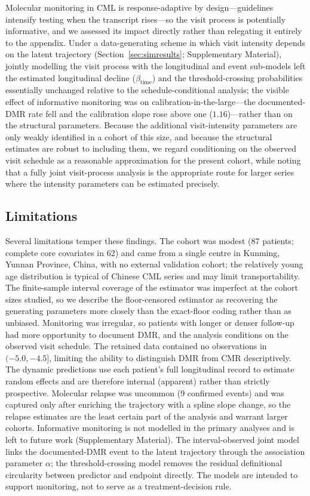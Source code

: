 \documentclass[11pt]{article}
\begin{document}
Molecular monitoring in CML is response-adaptive by design---guidelines
intensify testing when the transcript rises---so the visit process is
potentially informative, and we assessed its impact directly rather than
relegating it entirely to the appendix. Under a data-generating scheme in which
visit intensity depends on the latent trajectory
(Section~\ref{sec:simresults}; Supplementary Material), jointly modelling the
visit process with the longitudinal and event sub-models left the estimated
longitudinal decline ($\beta_{\mathrm{time}}$) and the threshold-crossing
probabilities essentially unchanged relative to the schedule-conditional
analysis; the visible effect of informative monitoring was on
calibration-in-the-large---the documented-DMR rate fell and the calibration
slope rose above one ($1.16$)---rather than on the structural parameters.
Because the additional visit-intensity parameters are only weakly identified in
a cohort of this size, and because the structural estimates are robust to
including them, we regard conditioning on the observed visit schedule as a
reasonable approximation for the present cohort, while noting that a fully
joint visit-process analysis is the appropriate route for larger series where
the intensity parameters can be estimated precisely.

\subsection{Limitations}

Several limitations temper these findings. The cohort was modest (87
patients; complete core covariates in 62) and came from a single centre in
Kunming, Yunnan Province, China, with no external validation cohort; the
relatively young age distribution is typical of Chinese CML series and may
limit transportability. The finite-sample interval coverage of the estimator
was imperfect at the cohort sizes studied, so we describe the floor-censored
estimator as recovering the generating parameters more closely than the
exact-floor coding rather than as unbiased. Monitoring was irregular, so
patients with longer or denser follow-up had more opportunity to document
DMR, and the analysis conditions on the observed visit schedule. The
retained data contained no observations in $(-5.0,-4.5]$, limiting the
ability to distinguish DMR from CMR descriptively. The dynamic predictions
use each patient's full longitudinal record to estimate random effects and
are therefore internal (apparent) rather than strictly prospective. Molecular
relapse was uncommon (9 confirmed events) and was captured only after enriching
the trajectory with a spline slope change, so the relapse estimates are the
least certain part of the analysis and warrant larger cohorts. Informative
monitoring is not modelled in the primary analyses and is left to future work
(Supplementary Material). The interval-observed joint model links the
documented-DMR event to the latent trajectory through the association parameter
$\alpha$; the threshold-crossing model removes the residual definitional
circularity between predictor and endpoint directly. The models are intended to
support monitoring, not to serve as a treatment-decision rule.
\end{document}
